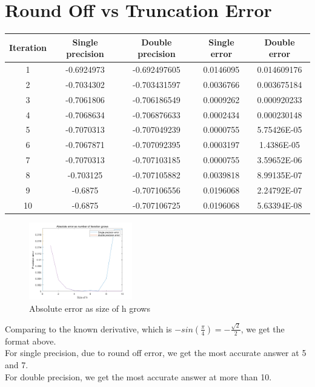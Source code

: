 \documentclass{article}
\begin{document}
\section{Round Off vs Truncation Error}
\begin{center}
\begin{longtable}{|c|c|c|c|c|}
Iteration	&	Single precision	&	Double precision	&	Single error	&	Double error	\\ \hline
1	&	-0.6924973	&	-0.692497605	&	0.0146095	&	0.014609176	\\ \hline
2	&	-0.7034302	&	-0.703431597	&	0.0036766	&	0.003675184	\\ \hline
3	&	-0.7061806	&	-0.706186549	&	0.0009262	&	0.000920233	\\ \hline
4	&	-0.7068634	&	-0.706876633	&	0.0002434	&	0.000230148	\\ \hline
5	&	-0.7070313	&	-0.707049239	&	0.0000755	&	5.75426E-05	\\ \hline
6	&	-0.7067871	&	-0.707092395	&	0.0003197	&	1.4386E-05	\\ \hline
7	&	-0.7070313	&	-0.707103185	&	0.0000755	&	3.59652E-06	\\ \hline
8	&	-0.703125	&	-0.707105882	&	0.0039818	&	8.99135E-07	\\ \hline
9	&	-0.6875	&	-0.707106556	&	0.0196068	&	2.24792E-07	\\ \hline
10	&	-0.6875	&	-0.707106725	&	0.0196068	&	5.63394E-08	\\ \hline



\end{longtable}
\end{center}
\begin{figure}[H]
\centering
\includegraphics[width=0.4\textwidth,height=0.3\textwidth]{problem4.png}
\caption{Absolute error as size of h grows}
\end{figure}

Comparing to the known derivative, which is $-sin\left(\frac{\pi}{4}\right)=-\frac{\sqrt{2}}{2}$, we get the format above.\\
For single precision, due to round off error, we get the most accurate answer at 5 and 7.\\
For double precision, we get the most accurate answer at more than 10.
\end{document}

